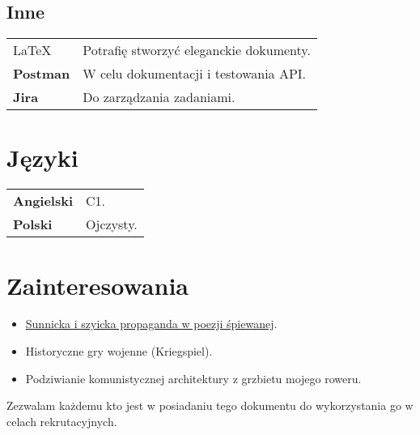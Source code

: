 \documentclass[10pt]{article}
\begin{document}
\subsection{Inne}
\begin{table}[H]
        \begin{tabularx}{\textwidth}{@{}l X}
         \LaTeX & Potrafię stworzyć eleganckie dokumenty. \\
         \textbf{Postman} & W celu dokumentacji i testowania API.  \\
         \textbf{Jira} & Do zarządzania zadaniami.  \\
\end{tabularx}
\end{table}
\section{Języki}
\begin{table}[H]
        \begin{tabularx}{\textwidth}{@{}l X}
         \bfseries Angielski & C1. \\
         \bfseries Polski & Ojczysty.  \\
\end{tabularx}
\end{table}
\section{Zainteresowania}
\begin{itemize}
    \item \href{http://cejsh.icm.edu.pl/cejsh/element/bwmeta1.element.desklight-b5b6fec4-8161-42ac-9a31-c0e6c344f9fa}{Sunnicka i szyicka propaganda w poezji śpiewanej}.
    \item Historyczne gry wojenne (Kriegspiel).
    \item Podziwianie komunistycznej architektury z grzbietu mojego roweru.
\end{itemize}
\vfill
\begin{center}
Zezwalam każdemu kto jest w posiadaniu tego dokumentu do wykorzystania go w celach rekrutacyjnych.
\end{center}
\end{document}
